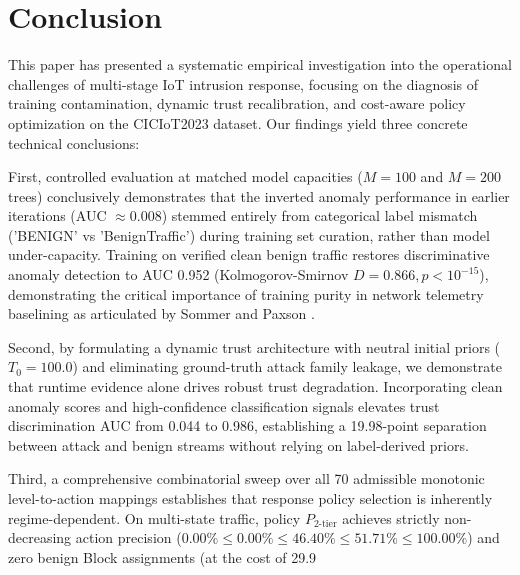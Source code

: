 \documentclass[journal,10pt,onecolumn]{IEEEtran}
\begin{document}
\section{Conclusion}

This paper has presented a systematic empirical investigation into the operational challenges of multi-stage IoT intrusion response, focusing on the diagnosis of training contamination, dynamic trust recalibration, and cost-aware policy optimization on the CICIoT2023 dataset. Our findings yield three concrete technical conclusions:

First, controlled evaluation at matched model capacities ($M=100$ and $M=200$ trees) conclusively demonstrates that the inverted anomaly performance in earlier iterations (AUC $\approx 0.008$) stemmed entirely from categorical label mismatch ('BENIGN' vs 'BenignTraffic') during training set curation, rather than model under-capacity. Training on verified clean benign traffic restores discriminative anomaly detection to AUC 0.952 (Kolmogorov-Smirnov $D = 0.866, p < 10^{-15}$), demonstrating the critical importance of training purity in network telemetry baselining as articulated by Sommer and Paxson \cite{16}.

Second, by formulating a dynamic trust architecture with neutral initial priors ($T_0 = 100.0$) and eliminating ground-truth attack family leakage, we demonstrate that runtime evidence alone drives robust trust degradation. Incorporating clean anomaly scores and high-confidence classification signals elevates trust discrimination AUC from 0.044 to 0.986, establishing a 19.98-point separation between attack and benign streams without relying on label-derived priors.

Third, a comprehensive combinatorial sweep over all 70 admissible monotonic level-to-action mappings establishes that response policy selection is inherently regime-dependent. On multi-state traffic, policy $P_{2\text{-tier}}$ achieves strictly non-decreasing action precision ($0.00\% \le 0.00\% \le 46.40\% \le 51.71\% \le 100.00\%$) and zero benign Block assignments (at the cost of 29.9%
\end{document}
